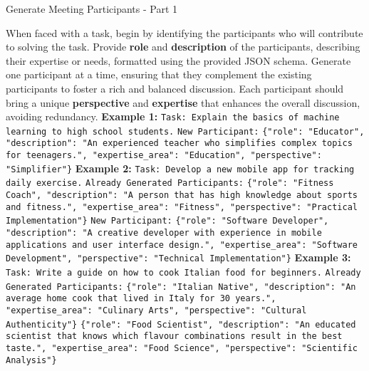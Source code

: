 \begin{figure*}[t]
    \begin{AIbox}{Generate Meeting Participants - Part 1}
    \parbox[t]{\textwidth}{
        When faced with a task, begin by identifying the participants who will contribute to solving the task. Provide \textbf{role} and \textbf{description} of the participants, describing their expertise or needs, formatted using the provided JSON schema. \newline
        Generate one participant at a time, ensuring that they complement the existing participants to foster a rich and balanced discussion. Each participant should bring a unique \textbf{perspective} and \textbf{expertise} that enhances the overall discussion, avoiding redundancy. \newline
        \textbf{Example 1:}
        \texttt{Task: Explain the basics of machine learning to high school students.} \newline
        \texttt{New Participant:}
        \texttt{\{"role": "Educator", "description": "An experienced teacher who simplifies complex topics for teenagers.", "expertise\_area": "Education", "perspective": "Simplifier"\}} 
        \newline
        \textbf{Example 2:}
        \texttt{Task: Develop a new mobile app for tracking daily exercise.} \newline
        \texttt{Already Generated Participants:} \newline
        \texttt{\{"role": "Fitness Coach", "description": "A person that has high knowledge about sports and fitness.", "expertise\_area": "Fitness", "perspective": "Practical Implementation"\}} \newline
        \texttt{New Participant:}
        \texttt{\{"role": "Software Developer", "description": "A creative developer with experience in mobile applications and user interface design.", "expertise\_area": "Software Development", "perspective": "Technical Implementation"\}} \newline
        \textbf{Example 3:}
        \texttt{Task: Write a guide on how to cook Italian food for beginners.} \newline
        \texttt{Already Generated Participants:} \texttt{\{"role": "Italian Native", "description": "An average home cook that lived in Italy for 30 years.", "expertise\_area": "Culinary Arts", "perspective": "Cultural Authenticity"\}} \newline
        \texttt{\{"role": "Food Scientist", "description": "An educated scientist that knows which flavour combinations result in the best taste.", "expertise\_area": "Food Science", "perspective": "Scientific Analysis"\}} \newline
}
\end{AIbox}
\end{figure*}
